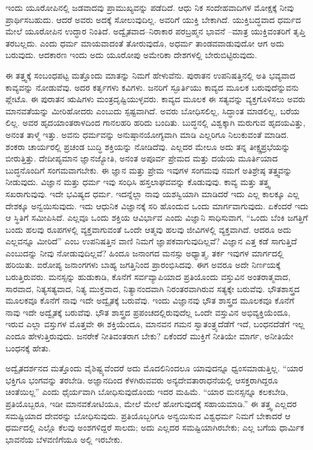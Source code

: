 ಇಂದು ಯೂರೋಪಿನಲ್ಲಿ ಜಡವಾದವು ಪ್ರಾಮುಖ್ಯವನ್ನು ಪಡೆದಿದೆ. ಆಧು ನಿಕ ಸಂದೇಹವಾದಿಗಳ ಮೋಕ್ಷಕ್ಕೆ ನೀವು ಪ್ರಾರ್ಥಿಸಬಹುದು. ಆದರೆ ಅವರು ಅದಕ್ಕೆ ಸೋಲುವುದಿಲ್ಲ. ಅವರಿಗೆ ಯುಕ್ತಿ ಬೇಕಾಗಿದೆ. ಯುಕ್ತಿಬದ್ಧವಾದ ಧರ್ಮದ ಮೇಲೆ ಯೂರೋಪಿನ ಉದ್ಧಾರ ನಿಂತಿದೆ. ಅದ್ವೈತವಾದ–ನಿರಾಕಾರ ಪರಬ್ರಹ್ಮನ ಭಾವನೆ –ಮಾತ್ರ ಯುಕ್ತಿವಂತರಿಗೆ ತೃಪ್ತಿ ತರಬಲ್ಲದು. ಎಂದು ಧರ್ಮ ಮಾಯವಾದಂತೆ ತೋರುವುದೊ, ಅಧರ್ಮ ತಾಂಡವವಾಡುವುದೋ ಆಗ ಅದು ಬರುವುದು. ಆದಕಾರಣ ಇಂದು ಅದು ಯೂರೋಪು ಅಮೇರಿಕಾ ದೇಶಗಳಲ್ಲಿ ಬೇರುಬಿಟ್ಟಿರುವುದು.

ಈ ತತ್ತ್ವಕ್ಕೆ ಸಂಬಂಧಪಟ್ಟ ಮತ್ತೊಂದು ಮಾತನ್ನು ನಿಮಗೆ ಹೇಳುವೆನು. ಪುರಾತನ ಉಪನಿಷತ್ತಿನಲ್ಲಿ ಅತಿ ಭವ್ಯವಾದ ಕಾವ್ಯವನ್ನು ನೋಡುವೆವು. ಅದರ ಕರ್ತೃಗಳು ಕವಿಗಳು. ಜನರಿಗೆ ಸ್ಫೂರ್ತಿಯು ಕಾವ್ಯದ ಮೂಲಕ ಬರುವುದೆನ್ನುವನು ಪ್ಲೇಟೊ. ಈ ಪುರಾತನ ಋಷಿಗಳು ಮಂತ್ರದೃಷ್ಟಿಯುಳ್ಳವರು. ಕಾವ್ಯದ ಮೂಲಕ ಈ ಸತ್ಯವನ್ನು ವ್ಯಕ್ತಗೊಳಿಸಲು ಅವರು ಮಾನವತೆಯನ್ನು ಮೀರಿಹೋದರು ಎಂಬುದು ಸ್ಪಷ್ಟವಾಗಿದೆ. ಅವರು ಬೋಧಿಸಲಿಲ್ಲ, ಸಿದ್ಧಾಂತ ಮಾಡಲಿಲ್ಲ, ಬರೆಯ ಲಿಲ್ಲ. ಅವರ ಹೃದಯಾಂತರಾಳದಿಂದ ಗಾನಲಹರಿ ಹರಿದು ಬಂದಿತು. ಬುದ್ಧನಲ್ಲಿ ವಿಶ್ವಕ್ಕಾಗಿ ಮರುಗುವ ಹೃದಯವಿತ್ತು, ಅನಂತ ತಾಳ್ಮೆ ಇತ್ತು. ಅವನು ಧರ್ಮವನ್ನು ಅನುಷ್ಠಾನಯೋಗ್ಯವಾಗಿ ಮಾಡಿ ಎಲ್ಲರಿಗೂ ನಿಲುಕುವಂತೆ ಮಾಡಿದ. ಶಂಕರಾ ಚಾರ್ಯರಲ್ಲಿ ಪ್ರಚಂಡ ಬುದ್ಧಿ ಶಕ್ತಿಯನ್ನು ನೋಡಿದೆವು. ಎಲ್ಲದರ ಮೇಲೂ ಅದು ತನ್ನ ತೀಕ್ಷ್ಣಪ್ರಭೆಯನ್ನು ಬೀರುತ್ತಿತ್ತು. ದೇದೀಪ್ಯಮಾನ ಜ್ಞಾನಜ್ಯೋತಿ, ಅನಂತ ಅಪೂರ್ವ ಪ್ರೇಮದ ಮತ್ತು ದಯೆಯ ಮೂರ್ತಿಯಾದ ಬುದ್ಧನೊಂದಿಗೆ ಸಂಗಮವಾಗಬೇಕು. ಈ ಜ್ಞಾನ ಮತ್ತು ಪ್ರೇಮ ಇವುಗಳ ಸಂಗಮವು ನಮಗೆ ಅತಿಶ್ರೇಷ್ಠ ತತ್ತ್ವವನ್ನು ನೀಡುವುದು. ವಿಜ್ಞಾನ ಮತ್ತು ಧರ್ಮ ಇವು ಸಂಧಿಸಿ ಹಸ್ತಲಾಘವವನ್ನು ಕೊಡುವುವು. ಕಾವ್ಯ ಮತ್ತು ತತ್ತ್ವ ಸಖರಾಗುವುವು. ಇದೇ ಭವಿಷ್ಯದ ಧರ್ಮ. ಇದನ್ನೆಲ್ಲಾ ನಾವು ಯಶಸ್ವಿಯಾಗಿ ಮಾಡಿದರೆ ಇದು ಎಲ್ಲ ಕಾಲಕ್ಕೂ ಎಲ್ಲ ದೇಶಕ್ಕೂ ಅನ್ವಯಿಸುವುದು. ಇದು ಆಧುನಿಕ ವಿಜ್ಞಾನಕ್ಕೆ ಸರಿ ಹೊಂದುವ ಒಂದು ಮಾರ್ಗವಾಗುವುದು. ಏಕೆಂದರೆ ಇದು ಆ ಸ್ಥಿತಿಗೆ ಸಮೀಪಿಸಿದೆ. ಎಲ್ಲವೂ ಒಂದು ಶಕ್ತಿಯ ಆವಿರ್ಭಾವ ಎಂದು ವಿಜ್ಞಾನಿ ಸಾಧಿಸುವಾಗ, “ಒಂದು ಬೆಂಕಿ ಜಗತ್ತಿಗೆ ಬಂದು ಹಲವು ರೂಪಗಳಲ್ಲಿ ವ್ಯಕ್ತವಾಗುವಂತೆ ಒಂದೇ ಆತ್ಮವು ಹಲವು ಜೀವಿಗಳಲ್ಲಿ ವ್ಯಕ್ತವಾಗಿದೆ. ಆದರೂ ಅದು ಎಲ್ಲವನ್ನೂ ಮೀರಿದೆ” ಎಂಬ ಉಪನಿಷತ್ತಿನ ವಾಣಿ ನಿಮಗೆ ಜ್ಞಾಪಕವಾಗುವುದಿಲ್ಲವೆ? ವಿಜ್ಞಾನ ಎತ್ತ ಕಡೆ ಸಾಗುತ್ತಿದೆ ಎಂಬುದನ್ನು ನೀವು ನೋಡುವುದಿಲ್ಲವೆ? ಹಿಂದೂ ಜನಾಂಗದ ಮನಸ್ಸು ಅಧ್ಯಾತ್ಮ, ತರ್ಕ ಇವುಗಳ ಮಾರ್ಗದಲ್ಲಿ ಹರಿಯಿತು. ಐರೋಪ್ಯ ಜನಾಂಗಗಳು ಬಾಹ್ಯ ಜಗತ್ತಿನಿಂದ ಪ್ರಾರಂಭಿಸಿದವು. ಈಗ ಅವರೂ ಅದೇ ನಿರ್ಣಯಕ್ಕೆ ಬರುತ್ತಿರುವರು. ಮನಸ್ಸನ್ನು ಹುಡುಕಾಡಿ, ಕೊನೆಗೆ ಸರ್ವವ್ಯಾಪಿಯಾದ ಪ್ರತಿಯೊಂದು ವಸ್ತುವಿನ ಅಂತರಾತ್ಮವಾದ, ಸಾರವಾದ, ನಿತ್ಯಸತ್ಯವಾದ, ನಿತ್ಯ ಮುಕ್ತವಾದ, ನಿತ್ಯಾನಂದವಾಗಿ ನಿರಂತರವಾಗಿರುವ ಸತ್ಯಕ್ಕೇ ಬರುವೆವು. ಭೌತಶಾಸ್ತ್ರದ ಮೂಲಕವೂ ಕೊನೆಗೆ ನಾವು ಇದೇ ಅದ್ವೈತಕ್ಕೆ ಬರುವೆವು. ಇಂದು ವಿಜ್ಞಾನವು ಭೌತ ಶಾಸ್ತ್ರದ ಮೂಲಕವೂ ಕೊನೆಗೆ ನಾವು ಇದೇ ಅದ್ವೈತಕ್ಕೆ ಬರುವೆವು. ಭೌತ ಶಾಸ್ತ್ರದ ಪ್ರಪಂಚದಲ್ಲಿರುವುದೆಲ್ಲ ಒಂದೇ ವಸ್ತುವಿನ ಅಭಿವ್ಯಕ್ತಿಯೆಂದೂ, ಇರುವ ಎಲ್ಲಾ ವಸ್ತುಗಳ ಮೊತ್ತವೇ ಈ ಶಕ್ತಿಯೆಂದೂ, ಮಾನವನ ಗಮನ ಸ್ವಾತಂತ್ರ್ಯದೆಡೆಗೆ ಇದೆ, ಬಂಧನದೆಡೆಗೆ ಇಲ್ಲ ಎಂದೂ ಹೇಳುತ್ತಿರುವುದು. ಜನರೇಕೆ ನೀತಿವಂತರಾಗ ಬೇಕು? ಏಕೆಂದರೆ ಮುಕ್ತಿಗೆ ನೀತಿಯೇ ಮಾರ್ಗ, ಅನೀತಿಯೇ ಬಂಧನಕ್ಕೆ ಹೇತು.

ಅದ್ವೈತದರ್ಶನದ ಮತ್ತೊಂದು ವೈಶಿಷ್ಟ್ಯವೆಂದರೆ ಅದು ಮೊದಲಿನಿಂದಲೂ ಯಾವುದನ್ನೂ ಧ್ವಂಸಮಾಡುತ್ತಿಲ್ಲ. “ಯಾರ ಭಕ್ತಿಗೂ ಭಂಗವನ್ನು ತರಬೇಡಿ. ಅಜ್ಞಾನದಿಂದ ಕೆಳಗಿರುವವರು ಅನ್ಯದೇವತಾರಾಧನೆಯಲ್ಲಿ ಆಸಕ್ತರಾಗಿದ್ದರೂ ಚಿಂತೆಯಿಲ್ಲ” ಎಂದು ಧೈರ್ಯವಾಗಿ ಬೋಧಿಸುವುದೊಂದು ಇದರ ಮಹಿಮೆ. “ಯಾರ ಮನಸ್ಸನ್ನೂ ಕಲಕಬೇಡಿ, ಪ್ರತಿಯೊಬ್ಬರೂ, ಇಡೀ ಮಾನವಕೋಟಿಯೂ, ಮೇಲೆ ಮೇಲೆ ಹೋಗುವುದಕ್ಕೆ ಸಹಾಯಮಾಡಿ.” ಈ ತತ್ತ್ವ ಎಲ್ಲದರ ಸಮಷ್ಟಿಯಾದ ದೇವರನ್ನು ಬೋಧಿಸುವುದು. ಪ್ರತಿಯೊಬ್ಬರಿಗೂ ಅನ್ವಯಿಸುವ ವಿಶ್ವಧರ್ಮ ನಿಮಗೆ ಬೇಕಾದರೆ ಆ ಧರ್ಮದಲ್ಲಿ ಎಲ್ಲೊ ಕೆಲವು ಅಂಶಗಳಿದ್ದರೆ ಸಾಲದು; ಅದು ಎಲ್ಲದರ ಸಮಷ್ಟಿಯಾಗಿರಬೇಕು; ಎಲ್ಲ ಬಗೆಯ ಧಾರ್ಮಿಕ ಭಾವನೆಯ ಬೆಳವಣಿಗೆಯೂ ಅಲ್ಲಿ ಇರಬೇಕು.

